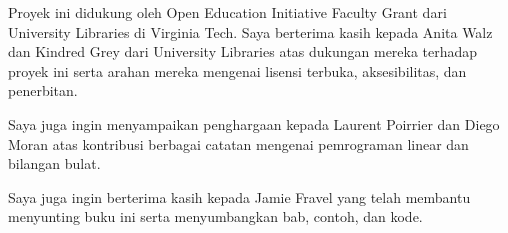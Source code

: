 Proyek ini didukung oleh Open Education Initiative Faculty Grant dari University Libraries di Virginia Tech. Saya berterima kasih kepada Anita Walz dan Kindred Grey dari University Libraries atas dukungan mereka terhadap proyek ini serta arahan mereka mengenai lisensi terbuka, aksesibilitas, dan penerbitan.

Saya juga ingin menyampaikan penghargaan kepada Laurent Poirrier dan Diego Moran atas kontribusi berbagai catatan mengenai pemrograman linear dan bilangan bulat.

Saya juga ingin berterima kasih kepada Jamie Fravel yang telah membantu menyunting buku ini serta menyumbangkan bab, contoh, dan kode.

\newpage

